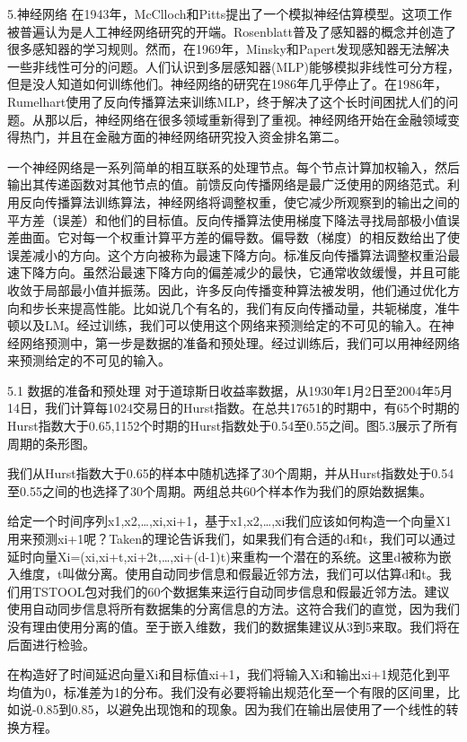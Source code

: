 \documentclass[12pt]{article}
\begin{document}
5.神经网络
在1943年，McClloch和Pitts提出了一个模拟神经估算模型。这项工作被普遍认为是人工神经网络研究的开端。Rosenblatt普及了感知器的概念并创造了很多感知器的学习规则。然而，在1969年，Minsky和Papert发现感知器无法解决一些非线性可分的问题。人们认识到多层感知器(MLP)能够模拟非线性可分方程，但是没人知道如何训练他们。神经网络的研究在1986年几乎停止了。在1986年，Rumelhart使用了反向传播算法来训练MLP，终于解决了这个长时间困扰人们的问题。从那以后，神经网络在很多领域重新得到了重视。神经网络开始在金融领域变得热门，并且在金融方面的神经网络研究投入资金排名第二。

一个神经网络是一系列简单的相互联系的处理节点。每个节点计算加权输入，然后输出其传递函数对其他节点的值。前馈反向传播网络是最广泛使用的网络范式。利用反向传播算法训练算法，神经网络将调整权重，使它减少所观察到的输出之间的平方差（误差）和他们的目标值。反向传播算法使用梯度下降法寻找局部极小值误差曲面。它对每一个权重计算平方差的偏导数。偏导数（梯度）的相反数给出了使误差减小的方向。这个方向被称为最速下降方向。标准反向传播算法调整权重沿最速下降方向。虽然沿最速下降方向的偏差减少的最快，它通常收敛缓慢，并且可能收敛于局部最小值并振荡。因此，许多反向传播变种算法被发明，他们通过优化方向和步长来提高性能。比如说几个有名的，我们有反向传播动量，共轭梯度，准牛顿以及LM。经过训练，我们可以使用这个网络来预测给定的不可见的输入。在神经网络预测中，第一步是数据的准备和预处理。经过训练后，我们可以用神经网络来预测给定的不可见的输入。

5.1 数据的准备和预处理
对于道琼斯日收益率数据，从1930年1月2日至2004年5月14日，我们计算每1024交易日的Hurst指数。在总共17651的时期中，有65个时期的Hurst指数大于0.65,1152个时期的Hurst指数处于0.54至0.55之间。图5.3展示了所有周期的条形图。

我们从Hurst指数大于0.65的样本中随机选择了30个周期，并从Hurst指数处于0.54至0.55之间的也选择了30个周期。两组总共60个样本作为我们的原始数据集。

给定一个时间序列x1,x2,…,xi,xi+1，基于x1,x2,…,xi我们应该如何构造一个向量X1用来预测xi+1呢？Taken的理论告诉我们，如果我们有合适的d和t，我们可以通过延时向量Xi=(xi,xi+t,xi+2t,…,xi+(d-1)t)来重构一个潜在的系统。这里d被称为嵌入维度，t叫做分离。使用自动同步信息和假最近邻方法，我们可以估算d和t。我们用TSTOOL包对我们的60个数据集来运行自动同步信息和假最近邻方法。建议使用自动同步信息将所有数据集的分离信息的方法。这符合我们的直觉，因为我们没有理由使用分离的值。至于嵌入维数，我们的数据集建议从3到5来取。我们将在后面进行检验。

在构造好了时间延迟向量Xi和目标值xi+1，我们将输入Xi和输出xi+1规范化到平均值为0，标准差为1的分布。我们没有必要将输出规范化至一个有限的区间里，比如说-0.85到0.85，以避免出现饱和的现象。因为我们在输出层使用了一个线性的转换方程。
\end{document}
